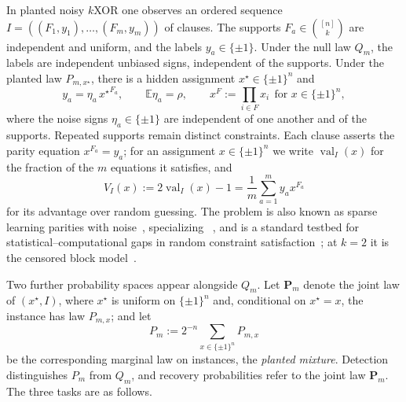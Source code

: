 \documentclass[11pt]{article}
\theoremstyle{definition}
\theoremstyle{remark}
\newcommand{\E}{\mathbb E}
\newcommand{\1}{\mathbf 1}
\newcommand{\xstar}{{x^\star}}
\DeclareMathOperator{\val}{val}
\numberwithin{equation}{section}
\begin{document}
In planted noisy $k$XOR one observes an ordered sequence
$I=((F_1,y_1),\ldots,(F_m,y_m))$ of clauses.  The supports
$F_a\in\binom{[n]}k$ are independent and uniform, and the labels
$y_a\in\{\pm1\}$.  Under the null law $Q_m$, the labels are independent
unbiased signs, independent of the supports.  Under the planted law $P_{m,x^\star}$, there is a
hidden assignment $\xstar\in\{\pm1\}^n$ and
\begin{equation}\label{eq:model}
 y_a=\eta_a\,\xstar^{F_a},
 \qquad
 \E\eta_a=\rho,
 \qquad
 x^F:=\prod_{i\in F}x_i\ \ \text{for }x\in\{\pm1\}^n,
\end{equation}
where the noise signs $\eta_a\in\{\pm1\}$ are independent of one
another and of the supports.  Repeated supports
remain distinct constraints.  Each clause asserts the parity equation
$x^{F_a}=y_a$; for an assignment $x\in\{\pm1\}^n$ we write $\val_I(x)$
for the fraction of the $m$ equations it satisfies, and
\begin{equation}\label{eq:VI}
 V_I(x):=2\val_I(x)-1=\frac1m\sum_{a=1}^m y_ax^{F_a}
\end{equation}
for its advantage over random guessing.  The problem is also known as sparse learning parities with noise~\cite{Ale03}, specializing
~\cite{BKW}, and is a standard testbed for
statistical--computational gaps in random constraint
satisfaction~\cite{FPV}; at $k=2$ it is the censored block
model~\cite{ABBS}.

Two further probability spaces appear alongside $Q_m$.  Let
$\mathbf P_m$ denote the joint law of $(\xstar,I)$, where $\xstar$ is
uniform on $\{\pm1\}^n$ and, conditional on $\xstar=x$, the instance
has law $P_{m,x}$; and let
\[
 P_m:=2^{-n}\sum_{x\in\{\pm1\}^n}P_{m,x}
\]
be the corresponding marginal law on instances, the \emph{planted
mixture}.  Detection
distinguishes $P_m$ from $Q_m$, and recovery probabilities refer to the
joint law $\mathbf P_m$.  The three
tasks are as follows.
\end{document}
